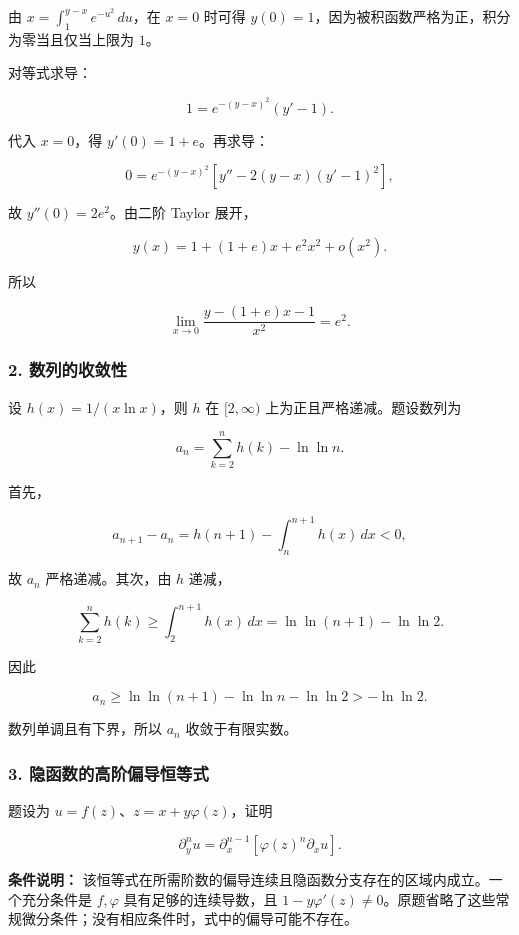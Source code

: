 \documentclass[11pt,fontset=fandol]{ctexart}
\begin{document}
由 \(\displaystyle x=\int_1^{y-x}e^{-u^2}\,du\)，在 \(x=0\) 时可得
\(y(0)=1\)，因为被积函数严格为正，积分为零当且仅当上限为 \(1\)。

对等式求导：

\[
1=e^{-(y-x)^2}(y'-1).
\]

代入 \(x=0\)，得 \(y'(0)=1+e\)。再求导：

\[
0=e^{-(y-x)^2}\left[y''-2(y-x)(y'-1)^2\right],
\]

故 \(y''(0)=2e^2\)。由二阶 Taylor 展开，

\[
y(x)=1+(1+e)x+e^2x^2+o(x^2).
\]

所以

\[
\boxed{\lim_{x\to0}\frac{y-(1+e)x-1}{x^2}=e^2}.
\]

\subsubsection{2.
数列的收敛性}\label{ux6570ux5217ux7684ux6536ux655bux6027}

设 \(h(x)=1/(x\ln x)\)，则 \(h\) 在 \([2,\infty)\)
上为正且严格递减。题设数列为

\[
a_n=\sum_{k=2}^nh(k)-\ln\ln n.
\]

首先，

\[
a_{n+1}-a_n
=h(n+1)-\int_n^{n+1}h(x)\,dx<0,
\]

故 \(a_n\) 严格递减。其次，由 \(h\) 递减，

\[
\sum_{k=2}^nh(k)\ge\int_2^{n+1}h(x)\,dx
=\ln\ln(n+1)-\ln\ln2.
\]

因此

\[
a_n\ge\ln\ln(n+1)-\ln\ln n-\ln\ln2>-\ln\ln2.
\]

数列单调且有下界，所以 \(\boxed{a_n\text{ 收敛于有限实数}}\)。

\subsubsection{3.
隐函数的高阶偏导恒等式}\label{ux9690ux51fdux6570ux7684ux9ad8ux9636ux504fux5bfcux6052ux7b49ux5f0f}

题设为 \(u=f(z)\)、\(z=x+y\varphi(z)\)，证明

\[
\partial_y^n u=\partial_x^{n-1}\left[\varphi(z)^n\partial_xu\right].
\]

\textbf{条件说明：}
该恒等式在所需阶数的偏导连续且隐函数分支存在的区域内成立。一个充分条件是
\(f,\varphi\) 具有足够的连续导数，且
\(1-y\varphi'(z)\ne0\)。原题省略了这些常规微分条件；没有相应条件时，式中的偏导可能不存在。
\end{document}
